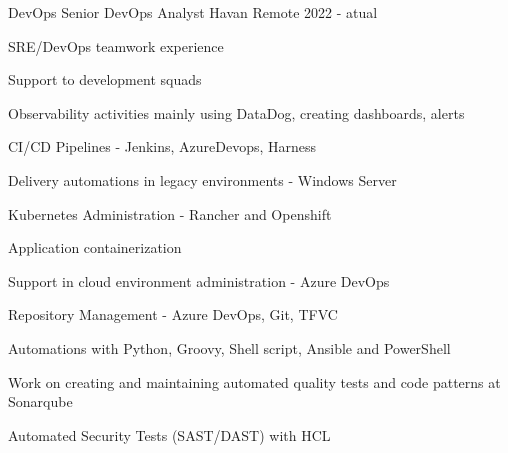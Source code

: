 

\begin{cventries}


  \cventry
    {DevOps Senior DevOps Analyst} %
    {Havan} %
    {Remote} %
    {2022 - atual} %
    {
      \begin{cvitems} %
        \item {SRE/DevOps teamwork experience}
        \item {Support to development squads}
        \item {Observability activities mainly using DataDog, creating dashboards, alerts}
        \item {CI/CD Pipelines - Jenkins, AzureDevops, Harness}
        \item {Delivery automations in legacy environments - Windows Server}
        \item {Kubernetes Administration - Rancher and Openshift}
        \item {Application containerization}
        \item {Support in cloud environment administration - Azure DevOps}
        \item {Repository Management - Azure DevOps, Git, TFVC}
        \item {Automations with Python, Groovy, Shell script, Ansible and PowerShell}
        \item {Work on creating and maintaining automated quality tests and code patterns at Sonarqube}
        \item {Automated Security Tests (SAST/DAST) with HCL}
      \end{cvitems}
    }


\end{cventries}
